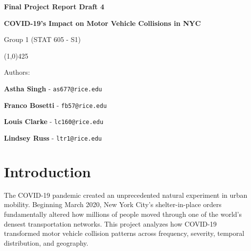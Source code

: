 \documentclass[10pt]{article}\usepackage[]{graphicx}\usepackage[]{xcolor}
\begin{document}
\begin{titlepage}
    \centering
    
    { \Huge \textbf{Final Project Report Draft 4} \par} 
    \vspace{5mm}
    { \huge \textbf{COVID-19's Impact on Motor Vehicle Collisions in NYC} \par} 
    \vspace{3mm}
    { \Large Group 1 (STAT 605 - S1)\par}  
    
    \vspace{5mm}
    \begin{center}
    \line(1,0){425}
    \end{center}
    
    \vspace{5mm}

    \vspace{15mm}
    { \large Authors: \par }
      \vspace{3mm}
    { \Large \textbf{Astha Singh} - \texttt{as677@rice.edu} \par}
    { \Large \textbf{Franco Bosetti} - \texttt{fb57@rice.edu}\par}
    { \Large \textbf{Louis Clarke} - \texttt{lc160@rice.edu}\par}
    { \Large \textbf{Lindsey Russ} - \texttt{ltr1@rice.edu}\par}
    
    
    \vspace{5mm}
    
    \vspace{5mm}

\end{titlepage}

\newpage


\tableofcontents

\newpage

\section{Introduction}

The COVID-19 pandemic created an unprecedented natural experiment in urban mobility. Beginning March 2020, New York City's shelter-in-place orders fundamentally altered how millions of people moved through one of the world's densest transportation networks. This project analyzes how COVID-19 transformed motor vehicle collision patterns across frequency, severity, temporal distribution, and geography.
\end{document}

